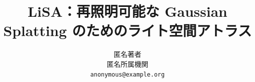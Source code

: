 \documentclass[10pt,twocolumn,letterpaper]{article}
\title{LiSA：再照明可能な Gaussian Splatting のためのライト空間アトラス}
\author{匿名著者\\
匿名所属機関\\
{\tt\small anonymous@example.org}
}
\begin{document}
\maketitle








{
    \small
    
    
}

\end{document}
